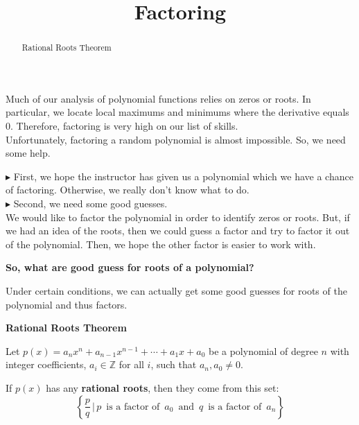 \documentclass{ximera}
\title{Factoring}
\begin{document}
\begin{abstract}
Rational Roots Theorem
\end{abstract}
\maketitle




Much of our analysis of polynomial functions relies on zeros or roots. In particular, we locate local maximums and minimums where the derivative equals $0$.  Therefore, factoring is very high on our list of skills. \\

Unfortunately, factoring a random polynomial is almost impossible.  So, we need some help.


$\blacktriangleright$ First, we hope the instructor has given us a polynomial which we have a chance of factoring.  Otherwise, we really don't know what to do. \\




$\blacktriangleright$ Second, we need some good guesses. \\


We would like to factor the polynomial in order to identify zeros or roots.  But, if we had an idea of the roots, then we could guess a factor and try to factor it out of the polynomial. Then, we hope the other factor is easier to work with.\\

\begin{center}
\textbf{\textcolor{red!80!black}{So, what are good guess for roots of a polynomial?}}
\end{center}


Under certain conditions, we can actually get some good guesses for roots of the polynomial and thus factors.






\begin{theorem} \textbf{\textcolor{green!50!black}{Rational Roots Theorem}} 



Let $p(x) = a_n x^n + a_{n-1} x^{n-1} + \cdots + a_1 x + a_0$ be a polynomial of degree $n$ with integer coefficients, $a_i \in \mathbb{Z}$ for all $i$, such that $a_n, a_0 \ne 0$.

If $p(x)$ has any \textbf{rational roots}, then they come from this set: 
\[
\left\{ \frac{p}{q} \, | \, p \, \text{ is a factor of } \, a_0 \, \text{ and } \, q \, \text{ is a factor of } \, a_n  \right\}
\]



\end{theorem}
\end{document}
